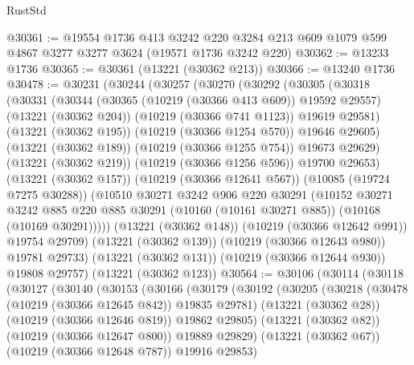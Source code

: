 \begin{lexlean}{RustStd}
\begin{coremodule}
@30361 := @19554
    @1736
    @413
    @3242
    @220
    @3284
    @213
    @609
    @1079
    @599
    @4867
    @3277
    @3277
    @3624
    (@19571 @1736 @3242 @220)
@30362 := @13233 @1736
@30365 := @30361 (@13221 (@30362 @213))
@30366 := @13240 @1736
@30478 := @30231
    (@30244
      (@30257
        (@30270
          (@30292
            (@30305
              (@30318
                (@30331
                  (@30344
                    (@30365 (@10219 (@30366 @413 @609)) @19592 @29557)
                    (@13221 (@30362 @204))
                    (@10219 (@30366 @741 @1123))
                    @19619
                    @29581)
                  (@13221 (@30362 @195))
                  (@10219 (@30366 @1254 @570))
                  @19646
                  @29605)
                (@13221 (@30362 @189))
                (@10219 (@30366 @1255 @754))
                @19673
                @29629)
              (@13221 (@30362 @219))
              (@10219 (@30366 @1256 @596))
              @19700
              @29653)
            (@13221 (@30362 @157))
            (@10219 (@30366 @12641 @567))
            (@10085 (@19724 @7275 @30288))
            (@10510
              @30271
              @3242
              @906
              @220
              @30291
              (@10152
                @30271
                @3242
                @885
                @220
                @885
                @30291
                (@10160 (@10161 @30271 @885))
                (@10168 (@10169 @30291)))))
          (@13221 (@30362 @148))
          (@10219 (@30366 @12642 @991))
          @19754
          @29709)
        (@13221 (@30362 @139))
        (@10219 (@30366 @12643 @980))
        @19781
        @29733)
      (@13221 (@30362 @131))
      (@10219 (@30366 @12644 @930))
      @19808
      @29757)
    (@13221 (@30362 @123))
@30564 := @30106
    (@30114
      (@30118
        (@30127
          (@30140
            (@30153
              (@30166
                (@30179
                  (@30192
                    (@30205
                      (@30218
                        (@30478 (@10219 (@30366 @12645 @842)) @19835 @29781)
                        (@13221 (@30362 @28))
                        (@10219 (@30366 @12646 @819))
                        @19862
                        @29805)
                      (@13221 (@30362 @82))
                      (@10219 (@30366 @12647 @800))
                      @19889
                      @29829)
                    (@13221 (@30362 @67))
                    (@10219 (@30366 @12648 @787))
                    @19916
                    @29853)

\end{coremodule}
\end{lexlean}
